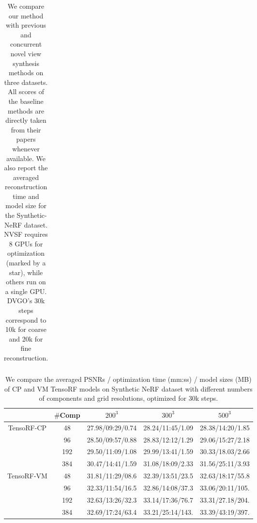 \documentclass[runningheads]{llncs}
\begin{document}
\begin{table}[t]
{\begin{tabular}{l|cc|cc|cc|cc|cc}
\end{tabular}
} 
\vspace{1mm}
\caption{We compare our method with previous and concurrent novel view synthesis methods on three datasets. All scores of the baseline methods are directly taken from their papers whenever available. We also report the averaged reconstruction time and model size for the Synthetic-NeRF dataset. NVSF requires 8 GPUs for optimization (marked by a star), while others run on a single GPU. DVGO's 30k steps correspond to 10k for coarse and 20k for fine reconstruction.} \vspace{-6mm}

\label{table:results}  
\end{table}
\setlength{\tabcolsep}{1.4pt}


\begin{table*}[tpb]
    \centering
\centering
        \renewcommand\tabcolsep{5.0pt}
        \begin{tabular}{c|c|c|c|c}
        \hline
        &$\#$Comp                        &         $200^3$       &    $300^3$            &      $500^3$\\
        \hline\hline
    \multirow{4}{*}{TensoRF-CP} &48   & 27.98/09:29/0.74      &  28.24/11:45/1.09     &  28.38/14:20/1.85 \\
                                &96   & 28.50/09:57/0.88      &  28.83/12:12/1.29     &  29.06/15:27/2.18 \\
                                &192  & 29.50/11:09/1.08      &  29.99/13:41/1.59     &  30.33/18.03/2.66 \\
                                &384  & 30.47/14:41/1.59      &  31.08/18:09/2.33     &  31.56/25:11/3.93 \\

        \hline
    \multirow{4}{*}{TensoRF-VM} &48   & 31.81/11:29/08.6 &     32.39/13:51/23.5 &   32.63/18:17/55.8  \\
                                &96   & 32.33/11:54/16.5 &     32.86/14:08/37.3 &   33.06/20:11/105. \\
                                &192  & 32.63/13:26/32.3 &     33.14/17:36/76.7 &   33.31/27.18/204. \\
                                &384  & 32.69/17:24/63.4 &     33.21/25:14/143. &   33.39/43:19/397.\\
        \hline
        \end{tabular}
    \caption{
    We compare the averaged PSNRs / optimization time (mm:ss) / model sizes (MB) of CP and VM TensoRF models on Synthetic NeRF dataset \cite{mildenhall2020nerf} with different numbers of components and grid resolutions, optimized for 30k steps.
}\vspace{-6mm}
    \label{tab:decomp}
\end{table*}
\end{document}
